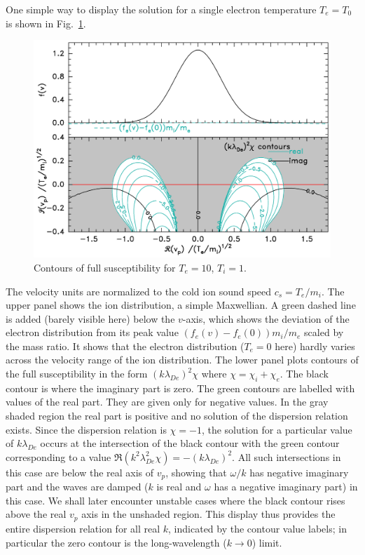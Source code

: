 \documentclass[12pt]{article}
\begin{document}
One simple way to display the solution for a single electron temperature
$T_e=T_0$ is shown in Fig.\ \ref{maxwellian}. 
\begin{figure}[htp]
  \centering
  \includegraphics[width=0.7\hsize]{maxwellian}
  \caption{Contours of full susceptibility for $T_e=10$, $T_i=1$.}
  \label{maxwellian}
\end{figure}
The velocity units are normalized to the cold ion sound speed
$c_{s}=T_e/m_i$.  The upper panel shows the ion distribution, a simple
Maxwellian. A green dashed line is added (barely visible here) below
the $v$-axis, which shows the deviation of the electron distribution
from its peak value $(f_e(v)-f_e(0))m_i/m_e$ scaled by the mass
ratio. It shows that the electron distribution ($T_e=0$ here) hardly
varies across the velocity range of the ion distribution. The lower
panel plots contours of the full susceptibility in the form
$(k\lambda_{De})^2\chi$ where $\chi=\chi_i+\chi_e$. The black contour
is where the imaginary part is zero. The green contours are labelled
with values of the real part. They are given only for negative
values. In the gray shaded region the real part is positive and no
solution of the dispersion relation exists.  Since the dispersion
relation is $\chi=-1$, the solution for a particular value of
$k\lambda_{De}$ occurs at the intersection of the black contour with
the green contour corresponding to a value
$\Re(k^2\lambda_{De}^2\chi)=-(k\lambda_{De})^2$.  All such
intersections in this case are below the real axis of $v_p$, showing
that $\omega/k$ has negative imaginary part and the waves are damped
($k$ is real and $\omega$ has a negative imaginary part) in this
case. We shall later encounter unstable cases where the black contour
rises above the real $v_p$ axis in the unshaded region.  This display
thus provides the entire dispersion relation for all real $k$,
indicated by the contour value labels; in particular the zero contour
is the long-wavelength ($k\to 0$) limit.
\end{document}
